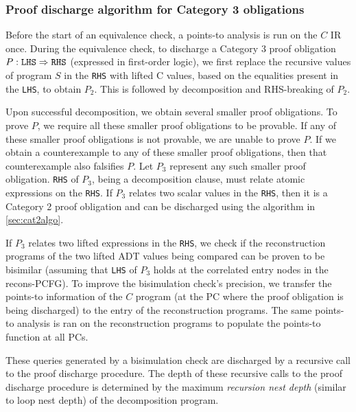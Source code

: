 \vspace{-5px}
\subsubsection{Proof discharge algorithm for Category 3 obligations}
\label{sec:cat3summary}

Before the start of an equivalence check, a points-to analysis is run on the $C$ IR once.
During the equivalence check,
to discharge a Category 3 proof obligation $P: {\tt LHS}\Rightarrow{\tt RHS}$ (expressed
in first-order logic), we first replace the recursive
values of program $S$ in the {\tt RHS}
with lifted C values, based on the equalities present in the {\tt LHS}, to
obtain $P_2$.
This is followed by decomposition and RHS-breaking of $P_2$.

Upon successful decomposition, we
obtain several smaller proof obligations.
To prove $P$, we require all these smaller proof
obligations to be provable. If any of these smaller proof obligations
is not provable, we are unable to prove $P$.  If we obtain a counterexample
to any of these smaller proof obligations, then that counterexample
also falsifies $P$.
Let $P_3$ represent any such smaller proof obligation.
{\tt RHS} of $P_3$, being
a decomposition clause,
must relate atomic expressions on the {\tt RHS}.
If $P_3$ relates two scalar values in the {\tt RHS}, then
it is
a Category 2 proof obligation and can be discharged
using the algorithm in \cref{sec:cat2algo}.

If $P_3$ relates two lifted
expressions in
the {\tt RHS},
we check if the reconstruction
programs of the two lifted ADT values being
compared can be proven to be bisimilar (assuming that
{\tt LHS} of $P_3$ holds at the correlated entry nodes
in the recons-PCFG).
To improve
the bisimulation
check's precision, we transfer the points-to information of the $C$ program
(at the PC where the proof obligation is being discharged) to the entry
of the reconstruction programs. The same points-to analysis is ran on the
reconstruction programs to populate the points-to function at all PCs.

These queries
generated by a bisimulation check are discharged
by a recursive call to the proof discharge procedure.
The depth of these recursive calls to the
proof discharge procedure is determined by
the maximum {\em recursion nest depth} (similar
to loop nest depth) of the decomposition
program.

